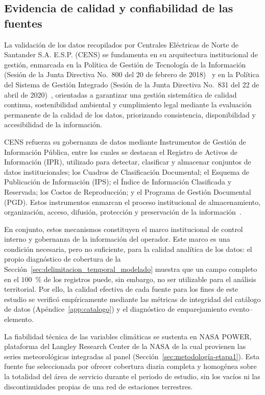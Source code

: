 \subsection{Evidencia de calidad y confiabilidad de las fuentes}
\label{sec:evidencia_calidad_fuentes}
    La validación de los datos recopilados por Centrales Eléctricas de Norte de Santander S.A. E.S.P. (CENS) se fundamenta en su arquitectura institucional de gestión, enmarcada en la Política de Gestión de Tecnología de la Información (Sesión de la Junta Directiva No.~800 del 20 de febrero de 2018)~\textcite{ref38} y en la Política del Sistema de Gestión Integrado (Sesión de la Junta Directiva No.~831 del 22 de abril de 2020)~\cite{ref39}, orientadas a garantizar una gestión sistemática de calidad continua, sostenibilidad ambiental y cumplimiento legal mediante la evaluación permanente de la calidad de los datos, priorizando consistencia, disponibilidad y accesibilidad de la información.
    
    CENS refuerza su gobernanza de datos mediante Instrumentos de Gestión de Información Pública, entre los cuales se destacan el Registro de Activos de Información (IPR), utilizado para detectar, clasificar y almacenar conjuntos de datos institucionales; los Cuadros de Clasificación Documental; el Esquema de Publicación de Información (IPS); el Índice de Información Clasificada y Reservada; los Costos de Reproducción; y el Programa de Gestión Documental (PGD). Estos instrumentos enmarcan el proceso institucional de almacenamiento, organización, acceso, difusión, protección y preservación de la información~\cite{ref40}.
    
    En conjunto, estos mecanismos constituyen el marco institucional de control interno y gobernanza de la información del operador. Este marco es una condición necesaria, pero no suficiente, para la calidad analítica de los datos: el propio diagnóstico de cobertura de la Sección~\ref{sec:delimitacion_temporal_modelado} muestra que un campo completo en el $100$~\% de los registros puede, sin embargo, no ser utilizable para el análisis territorial. Por ello, la calidad efectiva de cada fuente para los fines de este estudio se verificó empíricamente mediante las métricas de integridad del catálogo de datos (Apéndice~\ref{app:catalogo}) y el diagnóstico de emparejamiento evento--elemento.
    
    La fiabilidad técnica de las variables climáticas se sustenta en NASA POWER, plataforma del Langley Research Center de la NASA de la cual provienen las series meteorológicas integradas al panel (Sección~\ref{sec:metodología-etapa1}). Esta fuente fue seleccionada por ofrecer cobertura diaria completa y homogénea sobre la totalidad del área de servicio durante el periodo de estudio, sin los vacíos ni las discontinuidades propias de una red de estaciones terrestres.
    
